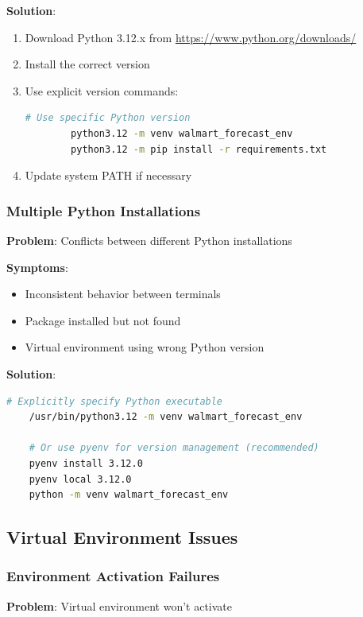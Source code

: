\textbf{Solution}:
\begin{enumerate}
	\item Download Python 3.12.x from \url{https://www.python.org/downloads/}
	\item Install the correct version
	\item Use explicit version commands:
	\begin{lstlisting}[language=bash]
		# Use specific Python version
		python3.12 -m venv walmart_forecast_env
		python3.12 -m pip install -r requirements.txt
	\end{lstlisting}
	\item Update system PATH if necessary
\end{enumerate}


\subsubsection{Multiple Python Installations}

\textbf{Problem}: Conflicts between different Python installations

\textbf{Symptoms}:
\begin{itemize}
	\item Inconsistent behavior between terminals
	\item Package installed but not found
	\item Virtual environment using wrong Python version
\end{itemize}

\textbf{Solution}:
\begin{lstlisting}[language=bash,basicstyle=\color{blue}]
	# Explicitly specify Python executable
	/usr/bin/python3.12 -m venv walmart_forecast_env
	
	# Or use pyenv for version management (recommended)
	pyenv install 3.12.0
	pyenv local 3.12.0
	python -m venv walmart_forecast_env
\end{lstlisting}

\subsection{Virtual Environment Issues}

\subsubsection{Environment Activation Failures}

\textbf{Problem}: Virtual environment won't activate

